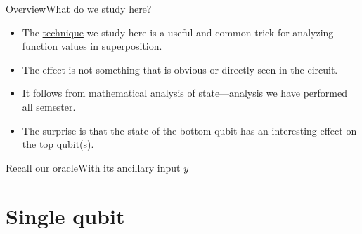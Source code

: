 
\begin{frame}{Overview}{What do we study here?}

\begin{itemize}[<+->]
   \item The \href{https://qiskit.org/textbook/ch-gates/phase-kickback.html}{technique} we study here is a useful and common trick for analyzing function values in superposition.
   \item The effect is not something that is obvious or directly seen in the circuit.
   \item It follows from mathematical analysis of state---analysis we have performed all semester.
   \item The surprise is that the state of the bottom qubit has an interesting effect on the top qubit(s).
\end{itemize}

\end{frame}

\begin{frame}{Recall our oracle}{With its ancillary input $y$}


\end{frame}

\section*{Single qubit}

